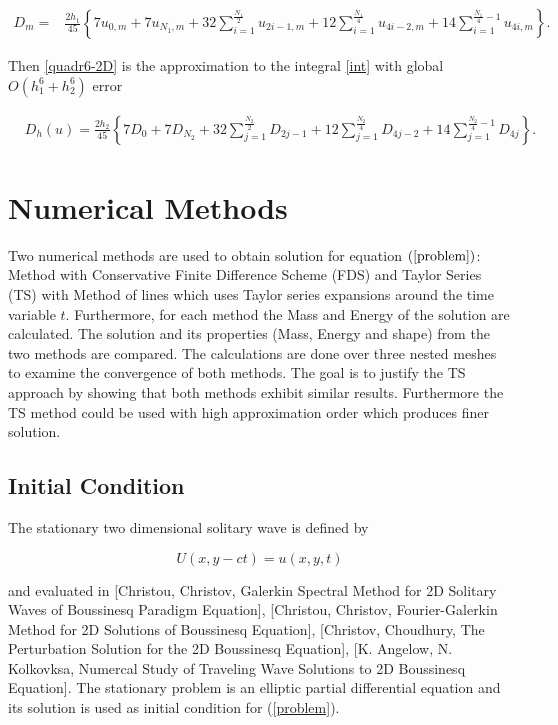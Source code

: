 \documentclass[%
 aip,
cp,  %
 amsmath,amssymb,%
 reprint,%
]{revtex4-2}
\newcommand{\rf}[1]{(\ref{#1})}
\begin{document}
\begin{align*}
D_m =& \frac{2h_1}{45} 
\left\{
7u_{0,m}+7u_{N_1,m}+32 \sum_{i=1}^{\frac{N_1}{2}}u_{2i-1,m}
+12\sum_{i=1}^{\frac{N_1}{4}}u_{4i-2,m}
+14 \sum_{i=1}^{\frac{N_1}{4}-1}u_{4i,m}
\right\}.
\end{align*}


Then \eqref{quadr6-2D} is the approximation to the integral \eqref{int} with global $O(h_1^6+h_2^6)$ error

\begin{align}\label{quadr6-2D}
&D_h(u) =
\frac{2h_2}{45} 
\left\{
7D_{0}+7D_{N_2}+32 \sum_{j=1}^{\frac{N_2}{2}}D_{2j-1}
+12\sum_{j=1}^{\frac{N_2}{4}}D_{4j-2}
+14 \sum_{j=1}^{\frac{N_2}{4}-1}D_{4j}
\right\}.
\end{align}


\section{Numerical Methods}

Two numerical methods are used to obtain solution for equation $\rf{problem}$: Method with Conservative Finite Difference Scheme (FDS) and Taylor Series (TS) with Method of lines which uses Taylor series expansions around the time variable $t$. Furthermore, for each method the Mass and Energy of the solution are calculated. The solution and its properties (Mass, Energy and shape) from the two methods are compared. The calculations are done over three nested meshes to examine the convergence of both methods. The goal is to justify the TS approach by showing that both methods exhibit similar results. Furthermore the TS method could be used with high approximation order which produces finer solution.

\subsection{ Initial Condition }
The stationary two dimensional solitary wave is defined by

$$U(x,y-ct) = u(x,y,t)$$

and evaluated in 
[Christou, Christov, Galerkin Spectral Method for 2D Solitary Waves of Boussinesq Paradigm Equation],
[Christou, Christov, Fourier-Galerkin Method for 2D Solutions of Boussinesq Equation],
[Christov, Choudhury, The Perturbation Solution for the 2D Boussinesq Equation],
[K. Angelow, N. Kolkovksa, Numercal Study of Traveling Wave Solutions to 2D Boussinesq Equation]. 
The stationary problem is an elliptic partial differential equation and its solution is used as initial condition for \rf{problem}.
\end{document}
